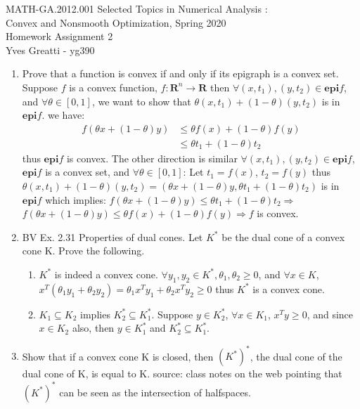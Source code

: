 \documentclass[10pt]{article}
\newcommand{\be}{\begin{enumerate}}
\newcommand{\ee}{\end{enumerate}}
\newcommand{\0}{\mat{0}}
\newcommand{\epi}{\textbf{epi}}
\begin{document}
\noindent MATH-GA.2012.001 Selected Topics in Numerical Analysis :\\
Convex and Nonsmooth Optimization, Spring 2020\\
Homework Assignment 2 \\
Yves Greatti - yg390\\

\begin{enumerate}

\item Prove that a function is convex if and only if its epigraph is a convex set. 
Suppose $f$ is a convex function, $f: \mathbf{R}^n \rightarrow \mathbf{R}$ then $\forall (x, t_1),(y, t_2) \in \epi f$, and $\forall  \theta \in [0, 1]$,
we want to show that $\theta (x, t_1) + (1-\theta) (y, t_2)$ is in $\epi f$.
we have:
\begin{align*}
	f(\theta x + (1-\theta) y)	&\le	\theta f(x) + (1 - \theta) f(y) \\
						&\le	\theta t_1 + (1 - \theta) t_2
\end{align*} thus $\epi f$ is convex. The other direction is similar  $\forall (x, t_1),(y, t_2) \in \epi f$, $\epi f$ is a convex set, and $\forall  \theta \in [0, 1]$:
Let $t_1 = f(x)$, $t_2 = f(y)$ thus $\theta (x, t_1) + (1-\theta) (y, t_2) = (\theta x + (1-\theta) y, \theta t_1 + (1-\theta) t_2)$ is in $\epi f$ which implies: 
$f(\theta x + (1-\theta) y) \le \theta t_1 + (1-\theta) t_2 \Rightarrow$  $f(\theta x + (1-\theta) y) \le \theta f(x) + (1-\theta) f(y) \Rightarrow f$ is convex.

\item BV Ex. 2.31 Properties of dual cones. Let $K^*$ be the dual cone of a convex cone K. Prove the following.
	\be 
		\item $K^*$  is indeed a convex cone.
		$\forall y_1, y_2  \in K^*, \theta_1, \theta_2 \ge 0$, and $\forall x \in K$, 
		$x^T (\theta_1 y_1 + \theta_2 y_2) = \theta_1 x^T y_1 + \theta_2 x^T y_2 \ge 0$ thus $K^*$ is a convex cone.
		
		\item $K_1 \subseteq K_2$ implies $K_2^* \subseteq K_1^*$.
		Suppose $y \in K_2^*$, $\forall x \in K_1$, $x^T y \ge 0$, and since $x \in K_2$ also, then $y \in K_1^*$ and $K_2^* \subseteq K_1^*$.
	\ee
	
\item Show that if a convex cone K is closed, then $(K^*)^*$, the dual cone of the dual cone of K, is equal to K.
source: class notes on the web pointing that $(K^*)^*$ can be seen as the intersection of halfspaces.


\end{enumerate}
\end{document}
